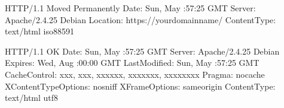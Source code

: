 \documentclass[letterpaper,10pt,english]{sphinxmanual}
\begin{document}
\begin{sphinxVerbatim}[commandchars=\\\{\},numbers=left,firstnumber=1,stepnumber=1]
HTTP/1.1  Moved Permanently
Date: Sun,  May  :57:25 GMT
Server: Apache/2.4.25 Debian
Location: https://your\PYGZhy{}domain\PYGZhy{}name/
Content\PYGZhy{}Type: text/html iso\PYGZhy{}8859\PYGZhy{}1

HTTP/1.1  OK
Date: Sun,  May  :57:25 GMT
Server: Apache/2.4.25 Debian
Expires: Wed,  Aug  :00:00 GMT
Last\PYGZhy{}Modified: Sun,  May  :57:25 GMT
Cache\PYGZhy{}Control: xxx, xxx, xxx\PYGZhy{}xxx, xxxxxxx, xxxxxxxx
Pragma: no\PYGZhy{}cache
X\PYGZhy{}Content\PYGZhy{}Type\PYGZhy{}Options: nosniff
X\PYGZhy{}Frame\PYGZhy{}Options: sameorigin
Content\PYGZhy{}Type: text/html utf\PYGZhy{}8
\end{sphinxVerbatim}
\end{document}
